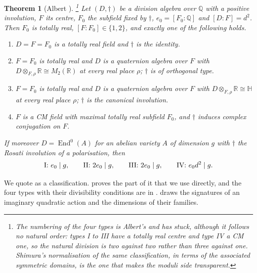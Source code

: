 \documentclass[11pt,reqno]{amsart}
\theoremstyle{plain}
\newtheorem{theorem}{Theorem}[section]
\theoremstyle{definition}
\theoremstyle{remark}
\newcommand{\QQ}{\mathbb{Q}}
\newcommand{\RR}{\mathbb{R}}
\DeclareMathOperator{\End}{End}
\begin{document}
\begin{theorem}[Albert \cite{Alb34,Alb35a,Alb35b}]\label{thm:albert}%
\footnote{The numbering of the four types is Albert's and has stuck, although
it follows no natural order: types I to III have a totally real centre and
type IV a CM one, so the natural division is two against two rather than three
against one. Shimura's normalisation of the same classification, in terms of
the associated symmetric domains, is the one that makes the moduli side
transparent.}
Let $(D,\dagger)$ be a division algebra over $\QQ$ with a positive involution,
$F$ its centre, $F_{0}$ the subfield fixed by $\dagger$, $e_{0}=[F_{0}:\QQ]$
and $[D:F]=d^{2}$. Then $F_{0}$ is totally real, $[F:F_{0}]\in\{1,2\}$, and
exactly one of the following holds.
\begin{enumerate}[label=\textup{Type \Roman*.},leftmargin=4.2em,itemsep=2pt]
\item $D=F=F_{0}$ is a totally real field and $\dagger$ is the identity.
\item $F=F_{0}$ is totally real and $D$ is a quaternion algebra over $F$ with
  $D\otimes_{F,\rho}\RR\cong M_{2}(\RR)$ at every real place $\rho$;
  $\dagger$ is of orthogonal type.
\item $F=F_{0}$ is totally real and $D$ is a quaternion algebra over $F$ with
  $D\otimes_{F,\rho}\RR\cong\mathbb{H}$ at every real place $\rho$; $\dagger$
  is the canonical involution.
\item $F$ is a CM field with maximal totally real subfield $F_{0}$, and
  $\dagger$ induces complex conjugation on $F$.
\end{enumerate}
If moreover $D=\End^{0}(A)$ for an abelian variety $A$ of dimension $g$ with
$\dagger$ the Rosati involution of a polarisation, then
\[
  \text{\rm I: } e_{0}\mid g,
  \qquad
  \text{\rm II: } 2e_{0}\mid g,
  \qquad
  \text{\rm III: } 2e_{0}\mid g,
  \qquad
  \text{\rm IV: } e_{0}d^{2}\mid g .
\]
\end{theorem}

We quote  as a classification. 
proves the part of it that we use directly, and the four types with their
divisibility conditions are in \cite[Ch.~9]{BL04}.  draws the
signatures of an imaginary quadratic action and the dimensions of their
families.
\end{document}
